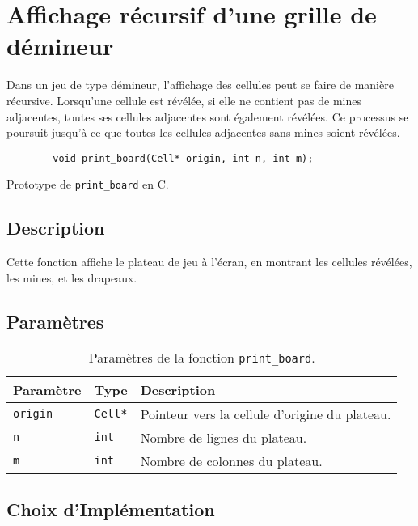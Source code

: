 \section{Affichage récursif d'une grille de démineur}
\label{sec:affichage-recursif}

Dans un jeu de type démineur, l'affichage des cellules peut se faire de manière récursive. Lorsqu'une cellule est révélée, si elle ne contient pas de mines adjacentes, toutes ses cellules adjacentes sont également révélées. 
Ce processus se poursuit jusqu'à ce que toutes les cellules adjacentes sans mines soient révélées.

\begin{listing}[!htpb]
    \begin{verbatim}
        void print_board(Cell* origin, int n, int m);
    \end{verbatim}
    \caption{Prototype de \texttt{print\_board} en C.}
    \label{listing:c-print_board-prototype}
\end{listing}

\subsection{Description}

Cette fonction affiche le plateau de jeu à l'écran, en montrant les cellules révélées, les mines, et les drapeaux.

\subsection{Paramètres}

\begin{table}[!htpb]
    \label{tab:parameters-print_board}
    \begin{tabularx}{\textwidth}{lXX}
        \toprule
        \textbf{Paramètre} & \textbf{Type} & \textbf{Description} \\
        \midrule
        \texttt{origin} & \texttt{Cell*} & Pointeur vers la cellule d'origine du plateau. \\
        \texttt{n} & \texttt{int} & Nombre de lignes du plateau. \\
        \texttt{m} & \texttt{int} & Nombre de colonnes du plateau. \\
        \bottomrule
    \end{tabularx}
    \caption{Paramètres de la fonction \texttt{print\_board}.}
\end{table}

\subsection{Choix d'Implémentation}

